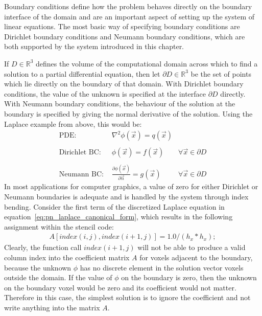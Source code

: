 Boundary conditions define how the problem behaves directly on the boundary interface of the domain and are an important aspect of setting up the system of linear equations. The most basic way of specifying boundary conditions are Dirichlet boundary conditions and Neumann boundary conditions, which are both supported by the system introduced in this chapter.

If $D\in\mathbb{R}^3$ defines the volume of the computational domain across which to find a solution to a partial differential equation, then let $\partial D\in\mathbb{R}^3$ be the set of points which lie directly on the boundary of that domain. With Dirichlet boundary conditions, the value of the unknown is specified at the interface $\partial D$ directly. With Neumann boundary conditions, the behaviour of the solution at the boundary is specified by giving the normal derivative of the solution. Using the Laplace example from above, this would be:
\begin{align*}
\text{PDE:\ \ } & \nabla^2\phi\left(\vec{x}\right) = q\left(\vec{x}\right)
&
\\
\\
\text{Dirichlet BC:\ \ } & \phi\left(\vec{x}\right) = f\left(\vec{x}\right)
&\forall \vec{x}\in\partial D
\\
\\
\text{Neumann BC:\ \ } & \frac{\partial\phi\left(\vec{x}\right)}{\partial\vec{n}} = g\left(\vec{x}\right)
&\forall \vec{x}\in\partial D
\end{align*}
In most applications for computer graphics, a value of zero for either Dirichlet or Neumann boundaries is adequate and is handled by the system through index bending. Consider the first term of the discretized Laplace equation in equation~\ref{eq:pn_laplace_canonical_form}, which results in the following assignment within the stencil code:
\begin{align}
A[index(i,j), index(i+1, j)] = 1.0/(h_x*h_x);
\end{align}
Clearly, the function call $index(i+1, j)$ will not be able to produce a valid column index into the coefficient matrix $A$ for voxels adjacent to the boundary, because the unknown $\phi$ has no discrete element in the solution vector voxels outside the domain. If the value of $\phi$ on the boundary is zero, then the unknown on the boundary voxel would be zero and its coefficient would not matter. Therefore in this case, the simplest solution is to ignore the coefficient and not write anything into the matrix $A$.

